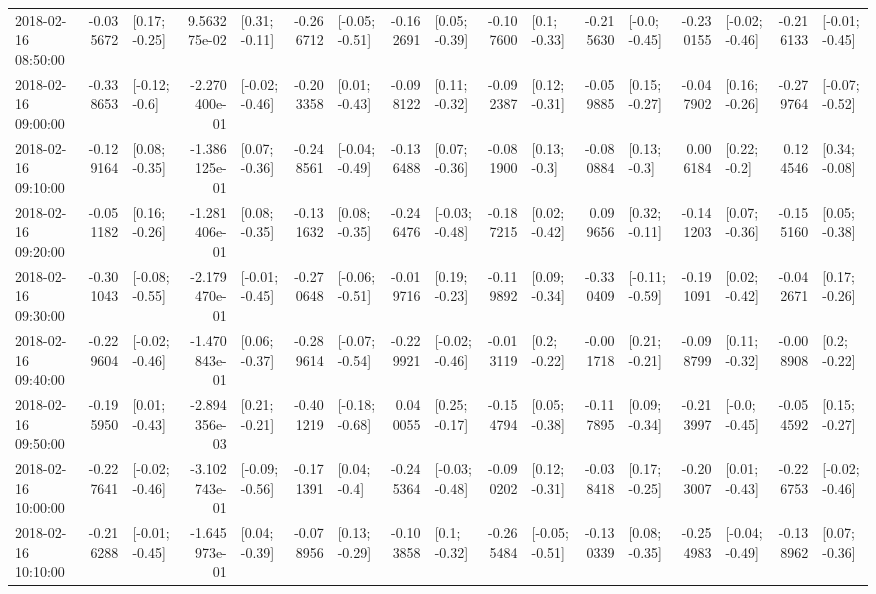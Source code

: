 \begin{tabular}{lrlrlrlrlrlrlrlrl}
2018-02-16 08:50:00 & -0.035672 &   [0.17; -0.25] &  9.563275e-02 &   [0.31; -0.11] & -0.266712 &  [-0.05; -0.51] & -0.162691 &   [0.05; -0.39] & -0.107600 &    [0.1; -0.33] & -0.215630 &   [-0.0; -0.45] & -0.230155 &  [-0.02; -0.46] & -0.216133 &  [-0.01; -0.45] \\
2018-02-16 09:00:00 & -0.338653 &   [-0.12; -0.6] & -2.270400e-01 &  [-0.02; -0.46] & -0.203358 &   [0.01; -0.43] & -0.098122 &   [0.11; -0.32] & -0.092387 &   [0.12; -0.31] & -0.059885 &   [0.15; -0.27] & -0.047902 &   [0.16; -0.26] & -0.279764 &  [-0.07; -0.52] \\
2018-02-16 09:10:00 & -0.129164 &   [0.08; -0.35] & -1.386125e-01 &   [0.07; -0.36] & -0.248561 &  [-0.04; -0.49] & -0.136488 &   [0.07; -0.36] & -0.081900 &    [0.13; -0.3] & -0.080884 &    [0.13; -0.3] &  0.006184 &    [0.22; -0.2] &  0.124546 &   [0.34; -0.08] \\
2018-02-16 09:20:00 & -0.051182 &   [0.16; -0.26] & -1.281406e-01 &   [0.08; -0.35] & -0.131632 &   [0.08; -0.35] & -0.246476 &  [-0.03; -0.48] & -0.187215 &   [0.02; -0.42] &  0.099656 &   [0.32; -0.11] & -0.141203 &   [0.07; -0.36] & -0.155160 &   [0.05; -0.38] \\
2018-02-16 09:30:00 & -0.301043 &  [-0.08; -0.55] & -2.179470e-01 &  [-0.01; -0.45] & -0.270648 &  [-0.06; -0.51] & -0.019716 &   [0.19; -0.23] & -0.119892 &   [0.09; -0.34] & -0.330409 &  [-0.11; -0.59] & -0.191091 &   [0.02; -0.42] & -0.042671 &   [0.17; -0.26] \\
2018-02-16 09:40:00 & -0.229604 &  [-0.02; -0.46] & -1.470843e-01 &   [0.06; -0.37] & -0.289614 &  [-0.07; -0.54] & -0.229921 &  [-0.02; -0.46] & -0.013119 &    [0.2; -0.22] & -0.001718 &   [0.21; -0.21] & -0.098799 &   [0.11; -0.32] & -0.008908 &    [0.2; -0.22] \\
2018-02-16 09:50:00 & -0.195950 &   [0.01; -0.43] & -2.894356e-03 &   [0.21; -0.21] & -0.401219 &  [-0.18; -0.68] &  0.040055 &   [0.25; -0.17] & -0.154794 &   [0.05; -0.38] & -0.117895 &   [0.09; -0.34] & -0.213997 &   [-0.0; -0.45] & -0.054592 &   [0.15; -0.27] \\
2018-02-16 10:00:00 & -0.227641 &  [-0.02; -0.46] & -3.102743e-01 &  [-0.09; -0.56] & -0.171391 &    [0.04; -0.4] & -0.245364 &  [-0.03; -0.48] & -0.090202 &   [0.12; -0.31] & -0.038418 &   [0.17; -0.25] & -0.203007 &   [0.01; -0.43] & -0.226753 &  [-0.02; -0.46] \\
2018-02-16 10:10:00 & -0.216288 &  [-0.01; -0.45] & -1.645973e-01 &   [0.04; -0.39] & -0.078956 &   [0.13; -0.29] & -0.103858 &    [0.1; -0.32] & -0.265484 &  [-0.05; -0.51] & -0.130339 &   [0.08; -0.35] & -0.254983 &  [-0.04; -0.49] & -0.138962 &   [0.07; -0.36] \\

\end{tabular}
